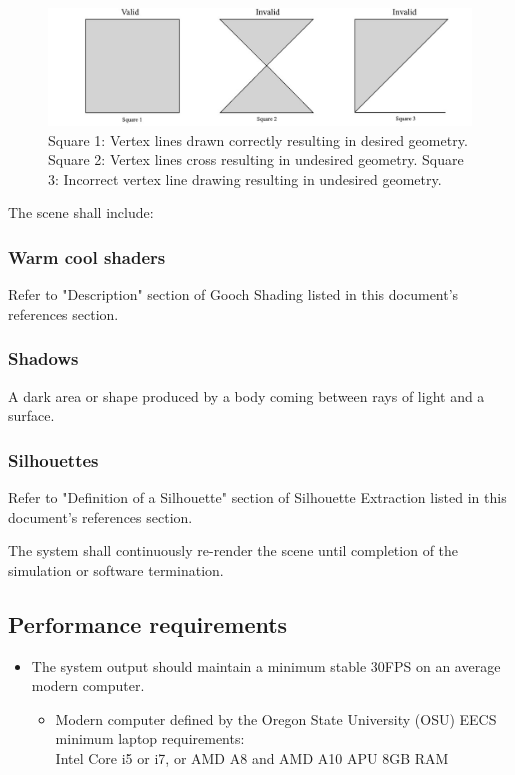 \documentclass[10pt,journal,compsoc]{IEEEtran}
\begin{document}
\begin{flushleft}
\begin{figure} [h]
  \includegraphics[width=\linewidth]{squares.jpg}
  \caption
{ \newline \hspace{\linewidth}
Square 1: Vertex lines drawn correctly resulting in desired geometry. \newline \hspace{\linewidth}
Square 2: Vertex lines cross resulting in undesired geometry. \newline \hspace{\linewidth}
Square 3: Incorrect vertex line drawing resulting in undesired geometry.}
  \label{fig:squares}
\end{figure}

\vspace{3mm}

The scene shall include:
\subsubsection{Warm cool shaders}
Refer to "Description" section of Gooch Shading listed in this document's references section.

\subsubsection{Shadows}
A dark area or shape produced by a body coming between rays of light and a surface.

\subsubsection{Silhouettes}
Refer to "Definition of a Silhouette" section of Silhouette Extraction listed in this document's references section.

\vspace{3mm}
The system shall continuously re-render the scene until completion of the simulation or software termination.

\subsection{Performance requirements}
\vspace{3mm}
\begin{itemize}
\item The system output should maintain a minimum stable 30FPS on an average modern computer.
\begin{itemize}
\item Modern computer defined by the Oregon State University (OSU) EECS minimum laptop requirements: \\
Intel Core i5 or i7, or AMD A8 and AMD A10 APU
8GB RAM


\end{itemize}
\end{itemize}
\end{flushleft}
\end{document}
